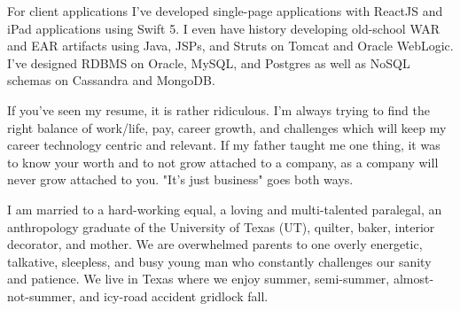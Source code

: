 For client applications I've developed single-page applications with ReactJS and iPad applications using Swift 5.  I even have history developing old-school WAR and EAR artifacts using Java, JSPs, and Struts on Tomcat and Oracle WebLogic.  I've designed RDBMS on Oracle, MySQL, and Postgres as well as NoSQL schemas on Cassandra and MongoDB.

If you've seen my resume, it is rather ridiculous.  I'm always trying to find the right balance of work/life, pay, career growth, and challenges which will keep my career technology centric and relevant.  If my father taught me one thing, it was to know your worth and to not grow attached to a company, as a company will never grow attached to you.  "It's just business" goes both ways.

I am married to a hard-working equal, a loving and multi-talented paralegal, an anthropology graduate of the University of Texas (UT), quilter, baker, interior decorator, and mother.  We are overwhelmed parents to one overly energetic, talkative, sleepless, and busy young man who constantly challenges our sanity and patience.  We live in Texas where we enjoy summer, semi-summer, almost-not-summer, and icy-road accident gridlock fall.
